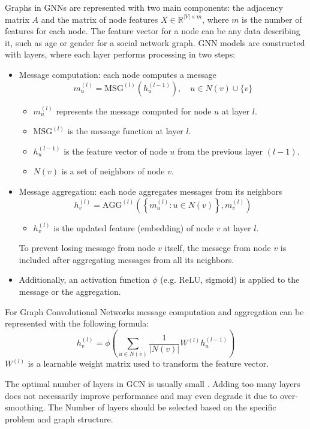 Graphs in GNNs are represented with two main components: the adjacency matrix $A$ and the matrix of node features $X \in \mathbb{R}^{|V| \times m}$, where $m$ is the number of features for each node. The feature vector for a node can be any data describing it, such as age or gender for a social network graph. GNN models are constructed with layers, where each layer performs processing in two steps:
\begin{itemize}
    \item Message computation: each node computes a message 
        \[m_u^{(l)} = \text{MSG}^{(l)}(h_u^{(l-1)}), \quad u \in N(v) \cup \{v\}\]
        \begin{itemize}
            \item $m_u^{(l)}$ represents the message computed for node $u$ at layer $l$.
            \item $\text{MSG}^{(l)}$ is the message function at layer $l$.
            \item $h_u^{(l-1)}$ is the feature vector of node $u$ from the previous layer $(l-1)$.
            \item $N(v)$ is a set of neighbors of node $v$.
        \end{itemize}
    \item Message aggregation: each node aggregates messages from its neighbors
        \[h_v^{(l)} = \text{AGG}^{(l)}\left(\left\{ m_u^{(l)} : u \in N(v) \right\}, m_v^{(l)}\right)\]
        \begin{itemize}
            \item $h_v^{(l)}$ is the updated feature (embedding) of node $v$ at layer $l$. 
        \end{itemize}
        To prevent losing message from node $v$ itself, the messege from node $v$ is included after aggregating messages from all its neighbors.   
    \item Additionally, an activation function $\phi$ (e.g. ReLU, sigmoid) is applied to the message or the aggregation.
\end{itemize}

For Graph Convolutional Networks message computation and aggregation can be represented with the following formula:
\[h_v^{(l)} = \phi \left( \sum_{u \in N(v)} \frac{1}{|N(v)|} W^{(l)} h_u^{(l-1)} \right)\]
$W^{(l)}$ is a learnable weight matrix used to transform the feature vector.

The optimal number of layers in GCN is usually small \cite{optimal_nr_of_layers}. Adding too many layers does not necessarily improve performance and may even degrade it due to over-smoothing. The Number of layers should be selected based on the specific problem and graph structure.

